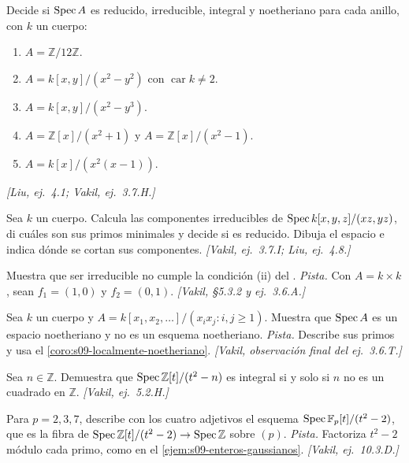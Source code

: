 \begin{samepage}
\begin{ejer}
\label{ejer:s09-clasificar-anillos}
Decide si $\operatorname{Spec} A$ es reducido, irreducible, integral y noetheriano para cada anillo, con $k$ un cuerpo:
\begin{enumerate}[label=(\alph*)]
\item $A=\mathbb Z/12\mathbb Z$.
\item $A=k[x,y]/(x^2-y^2)$ con $\operatorname{car}k\ne2$.
\item $A=k[x,y]/(x^2-y^3)$.
\item $A=\mathbb Z[x]/(x^2+1)$ y $A=\mathbb Z[x]/(x^2-1)$.
\item $A=k[x]/(x^2(x-1))$.
\end{enumerate}
\emph{[Liu, ej.~4.1; Vakil, ej.~3.7.H.]}
\end{ejer}
\end{samepage}

\begin{ejer}
\label{ejer:s09-componentes-plano-recta}
Sea $k$ un cuerpo. Calcula las componentes irreducibles de $\operatorname{Spec} k[x,y,z]/(xz,yz)$, di cuáles son sus primos minimales y decide si es reducido. Dibuja el espacio e indica dónde se cortan sus componentes. \emph{[Vakil, ej.~3.7.I; Liu, ej.~4.8.]}
\end{ejer}

\begin{ejer}
\label{ejer:s09-irreducible-no-afin-local}
Muestra que ser irreducible no cumple la condición (ii) del . \emph{Pista.} Con $A=k\times k$, sean $f_1=(1,0)$ y $f_2=(0,1)$. \emph{[Vakil, \S5.3.2 y ej.~3.6.A.]}
\end{ejer}

\begin{ejer}
\label{ejer:s09-espacio-noetheriano-esquema-no}
Sea $k$ un cuerpo y $A=k[x_1,x_2,\ldots]/(x_ix_j:i,j\ge1)$. Muestra que $\operatorname{Spec} A$ es un espacio noetheriano y no es un esquema noetheriano. \emph{Pista.} Describe sus primos y usa el \cref{coro:s09-localmente-noetheriano}. \emph{[Vakil, observación final del ej.~3.6.T.]}
\end{ejer}

\begin{ejer}
\label{ejer:s09-cuadratico-integral}
Sea $n\in\mathbb Z$. Demuestra que $\operatorname{Spec}\mathbb Z[t]/(t^2-n)$ es integral si y solo si $n$ no es un cuadrado en $\mathbb Z$. \emph{[Vakil, ej.~5.2.H.]}
\end{ejer}

\begin{ejer}
\label{ejer:s09-adjetivos-raiz-dos}
Para $p=2,3,7$, describe con los cuatro adjetivos el esquema $\operatorname{Spec}\mathbb F_p[t]/(t^2-2)$, que es la fibra de $\operatorname{Spec}\mathbb Z[t]/(t^2-2)\to\operatorname{Spec}\mathbb Z$ sobre $(p)$. \emph{Pista.} Factoriza $t^2-2$ módulo cada primo, como en el \cref{ejem:s09-enteros-gaussianos}. \emph{[Vakil, ej.~10.3.D.]}
\end{ejer}

